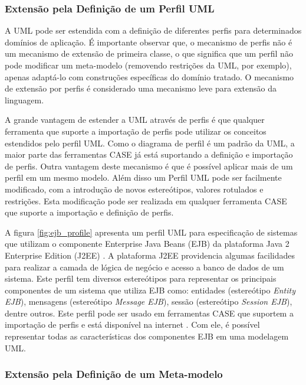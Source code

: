 \subsubsection{Extensão pela Definição de um Perfil UML}

A UML pode ser estendida com a definição de diferentes perfis para determinados domínios de aplicação. É importante observar que, o mecanismo de
perfis não é um mecanismo de extensão de primeira classe, o que significa que um perfil não pode modificar um meta-modelo (removendo restrições da
UML, por exemplo), apenas adaptá-lo com construções específicas do domínio tratado. O mecanismo de extensão por perfis é considerado uma mecanismo
leve para extensão da linguagem.

A grande vantagem de estender a UML através de perfis é que qualquer ferramenta que suporte a importação de perfis pode utilizar os conceitos
estendidos pelo perfil UML. Como o diagrama de perfil é um padrão da UML, a maior parte das ferramentas CASE já está suportando a definição e
importação de perfis. Outra vantagem deste mecanismo é que é possível aplicar mais de um perfil em um mesmo
modelo. Além disso um Perfil UML pode ser facilmente modificado, com a introdução de novos estereótipos, valores rotulados e restrições. Esta
modificação pode ser realizada em qualquer ferramenta CASE que suporte a importação e definição de perfis.

A figura \ref{fig:ejb_profile} apresenta um perfil UML para especificação de sistemas que utilizam o componente Enterprise Java Beans (EJB)
\cite{ejb:12} da plataforma Java 2 Enterprise Edition (J2EE) \cite{j2ee:12}. A plataforma J2EE providencia algumas facilidades para realizar a camada
de lógica de negócio e acesso a banco de dados de um sistema. Este perfil tem diversos estereótipos para representar os principais componentes de um
sistema que utiliza EJB como: entidades (estereótipo \textit{Entity EJB}), mensagens (estereótipo \textit{Message EJB}), sessão (estereótipo
\textit{Session EJB}), dentre outros. Este perfil pode ser usado em ferramentas CASE que suportem a importação de perfis e está disponível na internet
\cite{ejbprofile:12}. Com ele, é possível representar todas as características dos componentes EJB em uma modelagem UML.

\subsubsection{Extensão pela Definição de um Meta-modelo}

